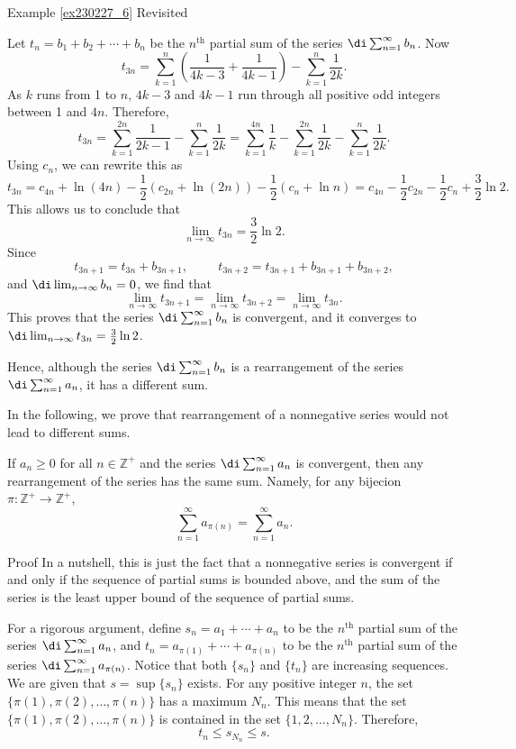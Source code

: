 \begin{example}{\linkt Example \ref{ex230227_6} Revisited}
\begin{example}[label=ex230227_13]{}
Let $t_n=b_1+b_2+\cdots+b_n$ be the $n^{\text{th}}$ partial sum of the series $\di\sum_{n=1}^{\infty}b_n$. Now \[t_{3n}=\sum_{k=1}^n\left(\frac{1}{4k-3}+\frac{1}{4k-1}\right) - \sum_{k=1}^n\frac{1}{2k}.\]As $k$ runs from 1 to $n$, $4k-3$ and $4k-1$ run through all positive odd integers between 1 and $4n$. Therefore,
\[t_{3n}=\sum_{k=1}^{2n}\frac{1}{2k-1}- \sum_{k=1}^n\frac{1}{2k}= \sum_{k=1}^{4n}\frac{1}{k}-\sum_{k=1}^{2n}\frac{1}{2k}- \sum_{k=1}^n\frac{1}{2k}.\]
Using $c_{n}$, we can rewrite this as
\[t_{3n}=c_{4n}+\ln(4n)-\frac{1}{2}\left(c_{2n}+\ln(2n)\right)-\frac{1}{2}\left(c_n+\ln n\right)=c_{4n}-\frac{1}{2}c_{2n}-\frac{1}{2}c_n+\frac{3}{2}\ln 2.\]This allows us to conclude that
\[\lim_{n\to\infty}t_{3n}=\frac{3}{2}\ln 2.\]Since
\[t_{3n+1}=t_{3n}+b_{3n+1},\hspace{1cm}t_{3n+2}=t_{3n+1}+b_{3n+1}+b_{3n+2},\]and $\di\lim_{n\to\infty}b_n=0$, we find that 
\[\lim_{n\to\infty}t_{3n+1}=\lim_{n\to\infty}t_{3n+2}=\lim_{n\to\infty}t_{3n}.\]
This proves that the series $\di\sum_{n=1}^{\infty} b_n$ is  convergent, and it converges to $\di\lim_{n\to\infty}t_{3n}=\frac{3}{2}\ln 2$.
 
Hence, although the series $\di\sum_{n=1}^{\infty}b_n$ is a rearrangement  of the series $\di\sum_{n=1}^{\infty}a_n$, it has a different sum.

In the following, we prove that rearrangement of a nonnegative series would not lead to different sums.
\begin{lemma}[label=230228_9]{}
If $a_n\geq 0$ for all $n\in\mathbb{Z}^+$ and the series $\di\sum_{n=1}^{\infty}a_n$ is convergent, then any rearrangement of the series has the same sum. Namely, for any bijecion $\pi:\mathbb{Z}^+\to\mathbb{Z}^+$, 
\[\sum_{n=1}^{\infty}a_{\pi(n)}=\sum_{n=1}^{\infty}a_n.\]
\end{lemma}\begin{myproof}{Proof}
In a nutshell, this is just the fact that a nonnegative series is convergent if and only if the sequence of partial sums is bounded above, and the sum of the series is the least upper bound of the sequence of partial sums. 

For a rigorous argument, define $s_n=a_1+\cdots+a_n$ to be the $n^{\text{th}}$ partial sum of the series  $\di\sum_{n=1}^{\infty}a_n$, and $t_n=a_{\pi(1)}+\cdots+a_{\pi(n)}$ to be the 
 $n^{\text{th}}$ partial sum of the series  $\di\sum_{n=1}^{\infty}a_{\pi(n)}$. Notice that both $\{s_n\}$ and $\{t_n\}$ are increasing sequences. We are given that $s=\sup\{s_n\}$ exists. For any positive integer $n$, the set $\{\pi(1), \pi(2), \ldots, \pi(n)\}$ has a maximum $N_n$. This means that the set $\{\pi(1), \pi(2), \ldots, \pi(n)\}$ is contained in the set $\{1, 2, \ldots, N_n\}$. Therefore,
\[t_{n}\leq s_{N_n}\leq s.\]


\end{myproof}
\end{example}
\end{example}
